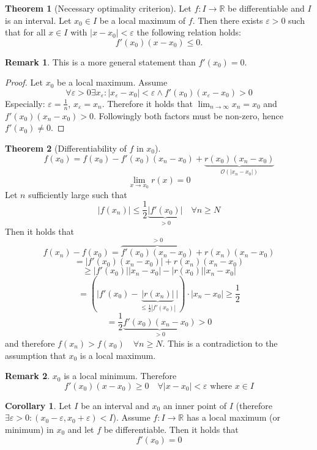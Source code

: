 \documentclass[a4paper,landscape,twocolumn]{article}
\theoremstyle{definition}
\newtheorem{theorem}{Theorem}
\newtheorem{rem}{Remark}
\newtheorem{cor}{Corollary}
\newcommand\abs[1]{\left|#1\right|}
\begin{document}
\begin{theorem}[Necessary optimality criterion]
  Let $f: I \to \mathbb R$ be differentiable and $I$ is an interval.
  Let $x_0 \in I$ be a local maximum of $f$.
  Then there exists $\varepsilon > 0$ such that for all $x \in I$
  with $\abs{x - x_0} < \varepsilon$ the following relation holds:
  \[ f'(x_0) (x - x_0) \leq 0. \]
\end{theorem}
\begin{rem}
  This is a more general statement than $f'(x_0) = 0$.
\end{rem}
\begin{proof}
  Let $x_0$ be a local maximum. Assume
  \[
    \forall \varepsilon > 0 \exists x_\varepsilon:
    \abs{x_\varepsilon - x_0} < \varepsilon
    \land f'(x_0) (x_\varepsilon - x_0) > 0
  \]
  Especially: $\varepsilon = \frac1n$, $x_\varepsilon = x_n$.
  Therefore it holds that $\lim_{n\to\infty} x_n = x_0$
  and $f'(x_0)(x_n - x_0) > 0$. Followingly both factors must
  be non-zero, hence $f'(x_0) \neq 0$.
\end{proof}
\begin{theorem}[Differentiability of $f$ in $x_0$]
  \[
    f(x_0) = f(x_0) - f'(x_0) (x_n - x_0)
    + \underbrace{r(x_0) (x_n - x_0)}_{\mathcal O(\abs{x_n - x_0})}
  \] \[
    \lim_{x\to x_0} r(x) = 0
  \]
  Let $n$ sufficiently large such that
  \[ \abs{f(x_n)} \leq \frac12 \underbrace{\abs{f'(x_0)}}_{>0} \quad \forall n \geq N \]
  Then it holds that
  \[ f(x_n) - f(x_0) = \overbrace{f'(x_0)(x_n - x_0)}^{>0} + r(x_n) (x_n - x_0) \]
  \[ = \abs{f'(x_0) (x_n - x_0)} + r(x_n) (x_n - x_0) \]
  \[ \geq \abs{f'(x_0)}\abs{x_n - x_0} - \abs{r(x_0)} \abs{x_n - x_0} \]
  \[ = (\Big|f'(x_0) - \underbrace{\abs{r(x_n)}}_{\leq \frac12 \abs{f'(x_0)}}\Big|) \cdot \abs{x_n - x_0} \geq \frac12 \]
  \[ = \frac12 \underbrace{f'(x_0) (x_n - x_0)}_{>0} > 0 \]
  and therefore $f(x_n) > f(x_0) \quad\forall n \geq N$.
  This is a contradiction to the assumption that $x_0$ is a local maximum.
\end{theorem}
\begin{rem}
  $x_0$ is a local minimum. Therefore
  \[ f'(x_0) (x - x_0) \geq 0 \quad \forall \abs{x - x_0} < \varepsilon \text{ where } x \in I \]
\end{rem}
%
\begin{cor}
  Let $I$ be an interval and $x_0$ an inner point of $I$
  (therefore $\exists \varepsilon > 0: (x_0 - \varepsilon, x_0 + \varepsilon) < I$).
  Assume $f: I \to \mathbb R$ has a local maximum (or minimum) in $x_0$
  and let $f$ be differentiable. Then it holds that
  \[ f'(x_0) = 0 \]
\end{cor}
\end{document}
